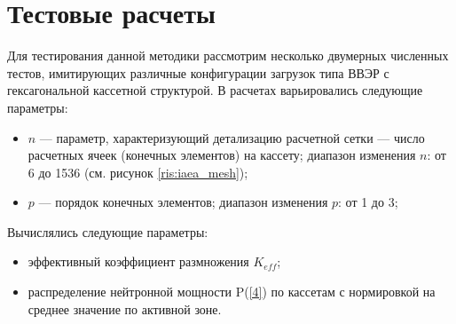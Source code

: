 \section{Тестовые расчеты}
\label{s-4}
Для тестирования данной методики рассмотрим несколько двумерных численных тестов, имитирующих различные конфигурации загрузок типа ВВЭР с гексагональной кассетной структурой. В расчетах варьировались следующие параметры:
\begin{itemize}\itemsep1pt \parskip0pt 
\item $n$ --- параметр, характеризующий детализацию расчетной сетки --- число расчетных ячеек (конечных элементов) на кассету; диапазон изменения $n$: от 6 до 1536 (см. рисунок \ref{ris:iaea_mesh});
\item $p$ --- порядок конечных элементов; диапазон изменения $p$: от 1 до 3;
\end{itemize}
Вычислялись следующие параметры:
\begin{itemize}\itemsep1pt \parskip0pt 
\item эффективный коэффициент размножения $K_{eff}$;
\item распределение нейтронной мощности P(\ref{4}) по кассетам с нормировкой на среднее значение по активной зоне.
\end{itemize}
